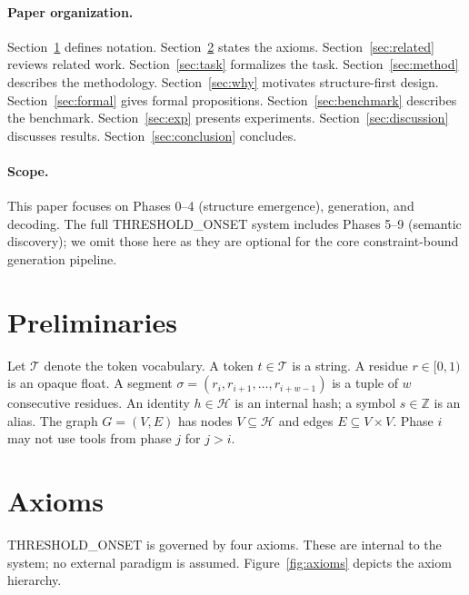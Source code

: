 \documentclass[10pt]{article}
\begin{document}
\paragraph{Paper organization.}
Section~\ref{sec:prelim} defines notation. Section~\ref{sec:axioms} states the axioms. Section~\ref{sec:related} reviews related work. Section~\ref{sec:task} formalizes the task. Section~\ref{sec:method} describes the methodology. Section~\ref{sec:why} motivates structure-first design. Section~\ref{sec:formal} gives formal propositions. Section~\ref{sec:benchmark} describes the benchmark. Section~\ref{sec:exp} presents experiments. Section~\ref{sec:discussion} discusses results. Section~\ref{sec:conclusion} concludes.

\paragraph{Scope.}
This paper focuses on Phases 0--4 (structure emergence), generation, and decoding. The full THRESHOLD\_ONSET system includes Phases 5--9 (semantic discovery); we omit those here as they are optional for the core constraint-bound generation pipeline.

\section{Preliminaries}
\label{sec:prelim}

Let $\mathcal{T}$ denote the token vocabulary. A token $t \in \mathcal{T}$ is a string. A residue $r \in [0, 1)$ is an opaque float. A segment $\sigma = (r_i, r_{i+1}, \ldots, r_{i+w-1})$ is a tuple of $w$ consecutive residues. An identity $h \in \mathcal{H}$ is an internal hash; a symbol $s \in \mathbb{Z}$ is an alias. The graph $G = (V, E)$ has nodes $V \subseteq \mathcal{H}$ and edges $E \subseteq V \times V$. Phase $i$ may not use tools from phase $j$ for $j > i$.

\section{Axioms}
\label{sec:axioms}

THRESHOLD\_ONSET is governed by four axioms. These are internal to the system; no external paradigm is assumed. Figure~\ref{fig:axioms} depicts the axiom hierarchy.
\end{document}
